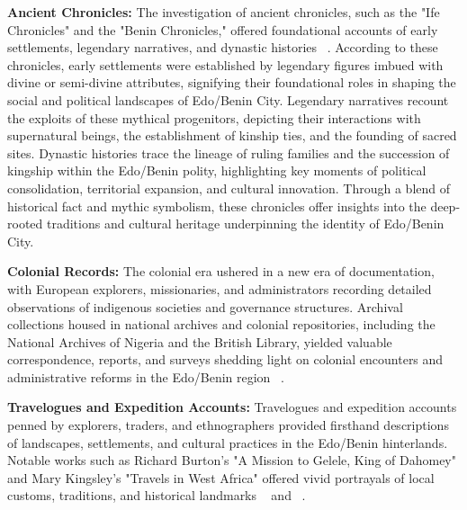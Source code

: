 \vspace{0.5cm}
\textbf{Ancient Chronicles:} The investigation of ancient chronicles, such as the "Ife Chronicles" and the "Benin Chronicles," offered foundational accounts of early settlements, legendary narratives, and dynastic histories ~\cite{otterbein1966}. According to these chronicles, early settlements were established by legendary figures imbued with divine or semi-divine attributes, signifying their foundational roles in shaping the social and political landscapes of Edo/Benin City. Legendary narratives recount the exploits of these mythical progenitors, depicting their interactions with supernatural beings, the establishment of kinship ties, and the founding of sacred sites. Dynastic histories trace the lineage of ruling families and the succession of kingship within the Edo/Benin polity, highlighting key moments of political consolidation, territorial expansion, and cultural innovation. Through a blend of historical fact and mythic symbolism, these chronicles offer insights into the deep-rooted traditions and cultural heritage underpinning the identity of Edo/Benin City.

\textbf{Colonial Records:} The colonial era ushered in a new era of documentation, with European explorers, missionaries, and administrators recording detailed observations of indigenous societies and governance structures. Archival collections housed in national archives and colonial repositories, including the National Archives of Nigeria and the British Library, yielded valuable correspondence, reports, and surveys shedding light on colonial encounters and administrative reforms in the Edo/Benin region ~\cite{oliver1985}.

\textbf{Travelogues and Expedition Accounts:} Travelogues and expedition accounts penned by explorers, traders, and ethnographers provided firsthand descriptions of landscapes, settlements, and cultural practices in the Edo/Benin hinterlands. Notable works such as Richard Burton's "A Mission to Gelele, King of Dahomey" and Mary Kingsley's "Travels in West Africa" offered vivid portrayals of local customs, traditions, and historical landmarks ~\cite{burton2011} and ~\cite{kingsley1988}.

